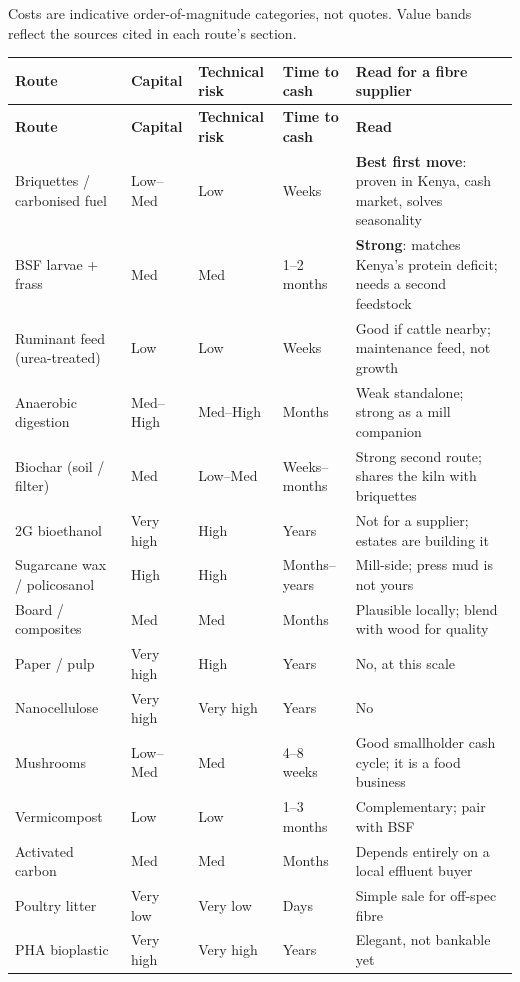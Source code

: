 \documentclass[11pt]{article}
\begin{document}
Costs are indicative order-of-magnitude categories, not quotes. Value bands
reflect the sources cited in each route's section.

\begin{center}
\small
\begin{longtable}{@{}p{}p{}p{}p{}p{}@{}}
\toprule
\textbf{Route} & \textbf{Capital} & \textbf{Technical risk} & \textbf{Time to cash} & \textbf{Read for a fibre supplier} \\
\midrule
\endfirsthead
\toprule
\textbf{Route} & \textbf{Capital} & \textbf{Technical risk} & \textbf{Time to cash} & \textbf{Read} \\
\midrule
\endhead
Briquettes / carbonised fuel & Low--Med & Low & Weeks & \textbf{Best first move}: proven in Kenya, cash market, solves seasonality \\
\addlinespace
BSF larvae + frass & Med & Med & 1--2 months & \textbf{Strong}: matches Kenya's protein deficit; needs a second feedstock \\
\addlinespace
Ruminant feed (urea-treated) & Low & Low & Weeks & Good if cattle nearby; maintenance feed, not growth \\
\addlinespace
Anaerobic digestion & Med--High & Med--High & Months & Weak standalone; strong as a mill companion \\
\addlinespace
Biochar (soil / filter) & Med & Low--Med & Weeks--months & Strong second route; shares the kiln with briquettes \\
\addlinespace
2G bioethanol & Very high & High & Years & Not for a supplier; estates are building it \\
\addlinespace
Sugarcane wax / policosanol & High & High & Months--years & Mill-side; press mud is not yours \\
\addlinespace
Board / composites & Med & Med & Months & Plausible locally; blend with wood for quality \\
\addlinespace
Paper / pulp & Very high & High & Years & No, at this scale \\
\addlinespace
Nanocellulose & Very high & Very high & Years & No \\
\addlinespace
Mushrooms & Low--Med & Med & 4--8 weeks & Good smallholder cash cycle; it is a food business \\
\addlinespace
Vermicompost & Low & Low & 1--3 months & Complementary; pair with BSF \\
\addlinespace
Activated carbon & Med & Med & Months & Depends entirely on a local effluent buyer \\
\addlinespace
Poultry litter & Very low & Very low & Days & Simple sale for off-spec fibre \\
\addlinespace
PHA bioplastic & Very high & Very high & Years & Elegant, not bankable yet \\
\bottomrule
\end{longtable}
\end{center}
\end{document}
